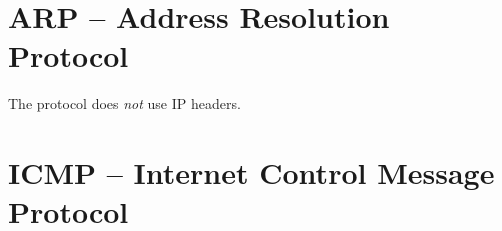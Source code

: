 \section{ARP -- Address Resolution Protocol}\label{sec:layer3:arp}
\begin{remark}
The  protocol does \textit{not} use IP headers.
\end{remark}

\section{ICMP -- Internet Control Message Protocol}\label{ßec:layer3:icmp}


